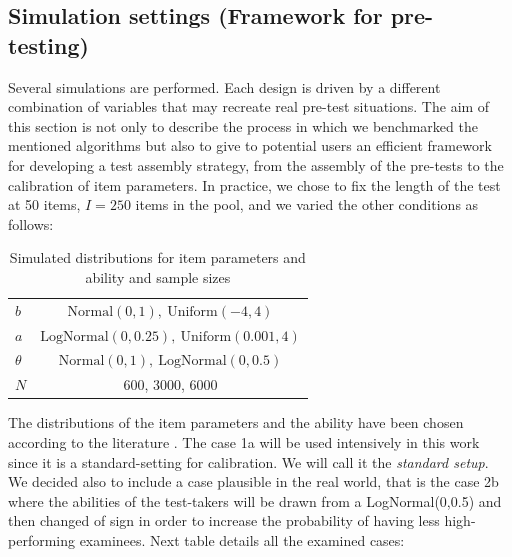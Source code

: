 \subsection{Simulation settings (Framework for pre-testing)} \label{sec:semcalbs}
\label{sec:sim_catbs}
Several simulations are performed. Each design is driven by a different combination of variables that may recreate real pre-test situations. The aim of this section is not only to describe the process in which we benchmarked the mentioned algorithms but also to give to potential users an efficient framework for developing a test assembly strategy, from the assembly of the pre-tests to the calibration of item parameters. 
In practice, we chose to fix the length of the test at 50 items, $I=250$ items in the pool, and we varied the other conditions as follows:

\renewcommand{\arraystretch}{1.3}%
\begin{table}[ht]
	\centering
	\caption{Simulated  distributions for item parameters and ability and sample sizes \label{tab:combJulia}}
	\begin{tabular}{ l  c }
		\toprule
		$b$         & $  \text{Normal}(0,1), \ \text{Uniform}(-4,4)  $ \\%
		$a$         & $  \text{LogNormal}(0,0.25), \ \text{Uniform}(0.001,4) $ \\%
		$\theta$    & $\text{Normal}(0,1), \ \text{LogNormal}(0,0.5)$ \\%
		$N$                             & 600, 3000, 6000 \\%
		\bottomrule  
	\end{tabular}
\end{table}
The distributions of the item parameters and the ability have been chosen according to the literature \parencite[see for example]{glas2005modeling, glas2005testing, ban2002data}.
The case 1a will be used intensively in this work since it is a standard-setting for calibration. We will call it the \emph{standard setup}.
We decided also to include a case plausible in the real world, that is the case 2b where the abilities of the test-takers will be drawn from a LogNormal(0,0.5) and then changed of sign in order to increase the probability of having less high-performing examinees. 
\renewcommand{\arraystretch}{1.3}%
Next table details all the examined cases:

